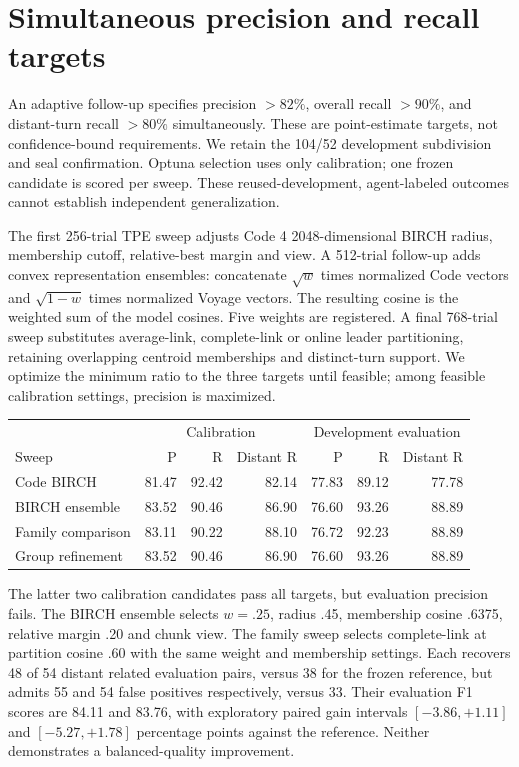 \section{Simultaneous precision and recall targets}
An adaptive follow-up specifies precision $>82\%$, overall recall $>90\%$,
and distant-turn recall $>80\%$ simultaneously. These are point-estimate targets,
not confidence-bound requirements. We retain the 104/52 development subdivision
and seal confirmation. Optuna selection uses only calibration; one frozen
candidate is scored per sweep. These reused-development, agent-labeled outcomes
cannot establish independent generalization.

The first 256-trial TPE sweep adjusts Code 4 2048-dimensional BIRCH radius,
membership cutoff, relative-best margin and view. A 512-trial follow-up adds
convex representation ensembles: concatenate $\sqrt{w}$ times normalized Code
vectors and $\sqrt{1-w}$ times normalized Voyage vectors. The resulting cosine
is the weighted sum of the model cosines. Five weights are registered.
A final 768-trial sweep substitutes average-link, complete-link or online leader
partitioning, retaining overlapping centroid memberships and distinct-turn
support. We optimize the minimum ratio to the three targets until feasible;
among feasible calibration settings, precision is maximized.

\begin{center}\small
\begin{tabular}{lrrrrrr}
\toprule
& \multicolumn{3}{c}{Calibration} & \multicolumn{3}{c}{Development evaluation}\\
Sweep & P & R & Distant R & P & R & Distant R\\
\midrule
Code BIRCH &81.47&92.42&82.14&77.83&89.12&77.78\\
BIRCH ensemble &83.52&90.46&86.90&76.60&93.26&88.89\\
Family comparison &83.11&90.22&88.10&76.72&92.23&88.89\\
Group refinement &83.52&90.46&86.90&76.60&93.26&88.89\\
\bottomrule
\end{tabular}
\end{center}
The latter two calibration candidates pass all targets, but evaluation precision
fails. The BIRCH ensemble selects $w=.25$, radius .45, membership cosine .6375,
relative margin .20 and chunk view. The family sweep selects complete-link at
partition cosine .60 with the same weight and membership settings. Each recovers
48 of 54 distant related evaluation pairs, versus 38 for the frozen reference,
but admits 55 and 54 false positives respectively, versus 33. Their evaluation
F1 scores are 84.11 and 83.76, with exploratory paired gain intervals
$[-3.86,+1.11]$ and $[-5.27,+1.78]$ percentage points against the reference.
Neither demonstrates a balanced-quality improvement.

